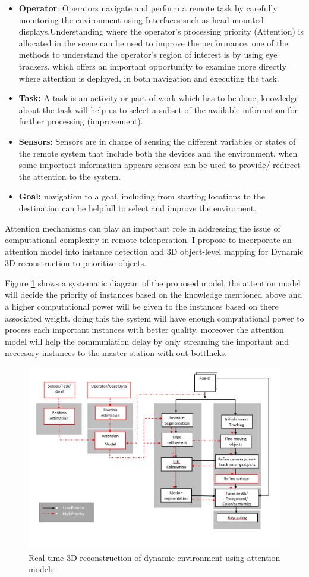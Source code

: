 \begin{itemize}
    \item \textbf{Operator}: Operators navigate and perform a remote task by carefully monitoring the environment using Interfaces such as head-mounted displays.Understanding where the operator's processing priority (Attention) is allocated in the scene can be used to improve the performance. one of the methods to understand the operator's region of interest is by using eye trackers. which offers an important opportunity to examine more directly where attention is deployed, in both navigation and executing the task.
    \item \textbf{Task:} A task is an activity or part of work which has to be done, knowledge about the task will help us to select a subset of the available information for further processing (improvement).
    \item \textbf{Sensors:} Sensors are in charge of sensing the different variables or states of the remote system that include both the devices and the environment. when some important information appears sensors can be used to provide/ redirect the attention to the system.
    \item \textbf{Goal:} navigation to a goal, including from starting locations to the destination can be helpfull to select and improve the enviroment. 
\end{itemize}

Attention mechanisms can play an important role in addressing the issue of computational complexity in remote teleoperation. I propose to incorporate an attention model into instance detection and 3D object-level mapping for Dynamic 3D reconstruction to prioritize objects.

Figure \ref{fig:Attention} shows a systematic diagram of the proposed model, the attention model will decide the priority of instances based on the knowledge mentioned above and a higher computational power will be given to the instances based on there associated weight.
doing this the system will have enough computational power to process each important instances with better quality. moreover the attention model will help the communiation delay by only streaming the important and neccesory instances to the master station with out bottlneks. 

\begin{figure}[h]
    \centering
    \includegraphics[scale=0.55]{images/Dyn_Reco_Attention.PNG}
    \caption{Real-time 3D reconstruction of dynamic environment using attention models}
    \label{fig:Attention}
\end{figure}\\